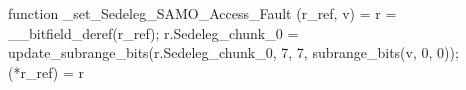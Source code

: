 function _set_Sedeleg_SAMO_Access_Fault (r_ref, v) = {
    r = __bitfield_deref(r_ref);
    r.Sedeleg_chunk_0 = update_subrange_bits(r.Sedeleg_chunk_0, 7, 7, subrange_bits(v, 0, 0));
    (*r_ref) = r
}
